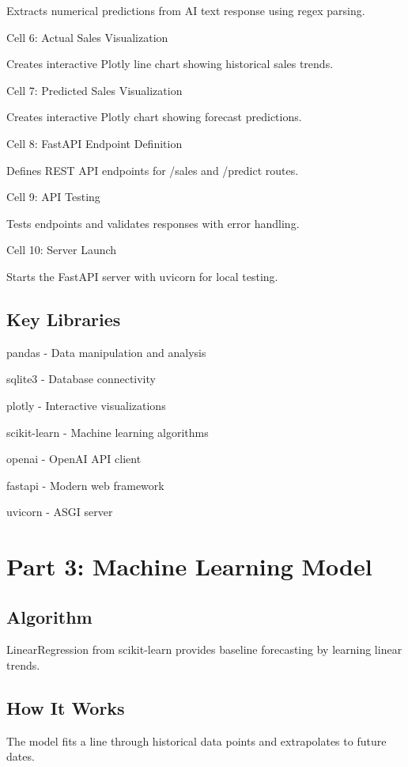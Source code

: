 \documentclass{article}
\begin{document}
Extracts numerical predictions from AI text response using regex parsing.

Cell 6: Actual Sales Visualization

Creates interactive Plotly line chart showing historical sales trends.

Cell 7: Predicted Sales Visualization

Creates interactive Plotly chart showing forecast predictions.

Cell 8: FastAPI Endpoint Definition

Defines REST API endpoints for /sales and /predict routes.

Cell 9: API Testing

Tests endpoints and validates responses with error handling.

Cell 10: Server Launch

Starts the FastAPI server with uvicorn for local testing.

\subsection{Key Libraries}

pandas - Data manipulation and analysis

sqlite3 - Database connectivity

plotly - Interactive visualizations

scikit-learn - Machine learning algorithms

openai - OpenAI API client

fastapi - Modern web framework

uvicorn - ASGI server

\section{Part 3: Machine Learning Model}

\subsection{Algorithm}

LinearRegression from scikit-learn provides baseline forecasting by learning linear trends.

\subsection{How It Works}

The model fits a line through historical data points and extrapolates to future dates.
\end{document}
